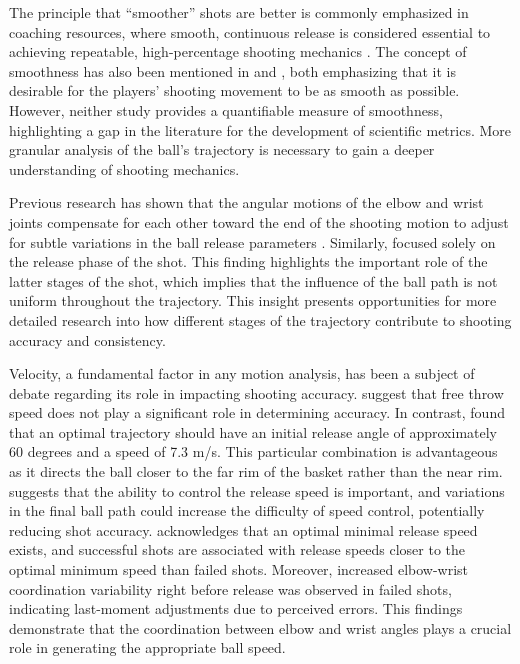 \documentclass{article}
\begin{document}
      The principle that ``smoother'' shots are better is commonly emphasized in coaching resources, where smooth, continuous release is considered essential to achieving repeatable, high-percentage shooting mechanics \citep{haefner_7_2010, penny_overlooked_2016}. The concept of smoothness has also been mentioned in \citet{pakosz_muscle_2021} and \citet{tran_optimal_2008}, both emphasizing that it is desirable for the players' shooting movement to be as smooth as possible. However, neither study provides a quantifiable measure of smoothness, highlighting a gap in the literature for the development of scientific metrics. More granular analysis of the ball’s trajectory is necessary to gain a deeper understanding of shooting mechanics.

      Previous research has shown that the angular motions of the elbow and wrist joints compensate for each other toward the end of the shooting motion to adjust for subtle variations in the ball release parameters \citep{button_examining_2003}. Similarly, \citet{tran_optimal_2008} focused solely on the release phase of the shot. This finding highlights the important role of the latter stages of the shot, which implies that the influence of the ball path is not uniform throughout the trajectory. This insight presents opportunities for more detailed research into how different stages of the trajectory contribute to shooting accuracy and consistency.

      Velocity, a fundamental factor in any motion analysis, has been a subject of debate regarding its role in impacting shooting accuracy. \citet{pakosz_muscle_2021} suggest that free throw speed does not play a significant role in determining accuracy. In contrast, \citet{hamilton_optimal_1997} found that an optimal trajectory should have an initial release angle of approximately 60 degrees and a speed of 7.3 m/s. This particular combination is advantageous as it directs the ball closer to the far rim of the basket rather than the near rim. \citet{slegers_role_2024} suggests that the ability to control the release speed is important, and variations in the final ball path could increase the difficulty of speed control, potentially reducing shot accuracy. \citet{mullineaux_coordination-variability_2010} acknowledges that an optimal minimal release speed exists, and successful shots are associated with release speeds closer to the optimal minimum speed than failed shots. Moreover, increased elbow-wrist coordination variability right before release was observed in failed shots, indicating last-moment adjustments due to perceived errors. This findings demonstrate that the coordination between elbow and wrist angles plays a crucial role in generating the appropriate ball speed.
      
\end{document}
